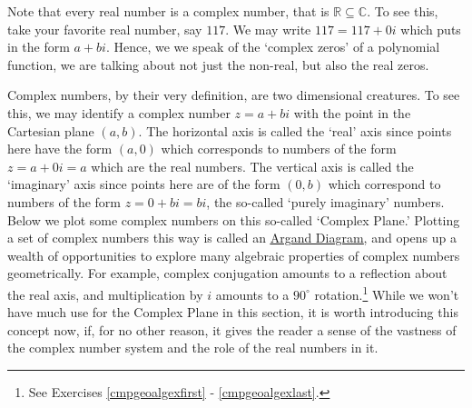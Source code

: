 \documentclass{ximera}
\begin{document}

Note that every real number is a complex number, that is $\mathbb{R} \subseteq \mathbb{C}$.  To see this, take your favorite real number, say $117$.  We may write $117 = 117 + 0 i$ which puts in the form $a + bi$.  Hence, we we speak of the `complex zeros' of a polynomial function, we are talking about not just the non-real, but also the real zeros.

Complex numbers, by their very definition, are two dimensional creatures.  To see this, we may identify a complex number $z = a+bi$ with the point in the Cartesian plane $(a,b)$. The horizontal axis is called the `real' axis since points here have the form $(a,0)$ which corresponds to numbers of the form $z = a + 0i = a$ which are the real numbers. The vertical axis is called the `imaginary' axis since points here are of the form $(0,b)$ which correspond to numbers of the form $z = 0+bi = bi$,  the so-called `purely imaginary' numbers.  Below we plot some complex numbers on this so-called  `Complex Plane.'  Plotting a set of complex numbers this way is called an \href{https://en.wikipedia.org/wiki/Complex_plane}{\underline{Argand Diagram}}, and opens up a wealth of opportunities to explore many algebraic properties of complex numbers geometrically. For example, complex conjugation amounts to a reflection about the real axis, and multiplication by $i$ amounts to a $90^{\circ}$ rotation.\footnote{See Exercises \ref{cmpgeoalgexfirst} - \ref{cmpgeoalgexlast}.}  While we won't have much use for the Complex Plane in this section, it is worth introducing this concept now, if, for no other reason, it gives the reader a sense of the vastness of the complex number system and the role of the real numbers in it.
\end{document}
